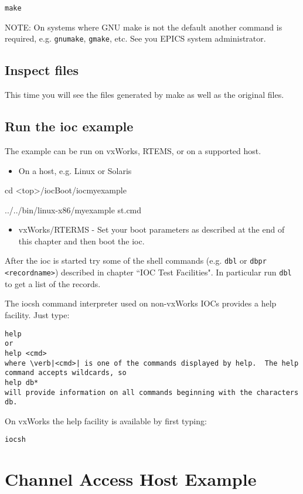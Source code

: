 \begin{verbatim}make
\end{verbatim}NOTE: On systems where GNU make is not the default another command is required, e.g. \verb|gnumake|, \verb|gmake|, etc. See 
you EPICS system administrator.

\subsection{Inspect files}

This time you will see the files generated by make as well as the original files.

\subsection{Run the ioc example}

The example can be run on vxWorks, RTEMS, or on a supported host.

\begin{itemize}\item On a host, e.g. Linux or Solaris

\end{itemize}cd \textless{}top\textgreater{}/iocBoot/iocmyexample

../../bin/linux-x86/myexample st.cmd

\begin{itemize}\item vxWorks/RTERMS - Set your boot parameters as described at the end of this chapter and then boot the ioc.

\end{itemize}After the ioc is started try some of the shell commands (e.g. \verb|dbl| or \verb|dbpr <recordname>|) described in chapter ``IOC 
Test Facilities". In particular run \verb|dbl| to get a list of the records.

The iocsh command interpreter used on non-vxWorks IOCs provides a help facility. Just type:

\begin{verbatim}help
or
help <cmd>
where \verb|<cmd>| is one of the commands displayed by help.  The help command accepts wildcards, so
help db*
will provide information on all commands beginning with the characters db.
\end{verbatim}On vxWorks the help facility is available by first typing:

\begin{verbatim}iocsh
\end{verbatim}\section{Channel Access Host Example}

